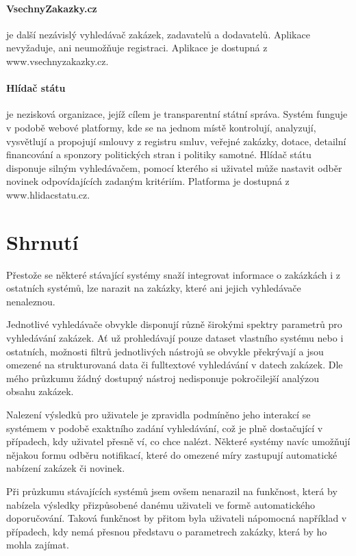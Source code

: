 \documentclass[thesis=M,czech]{FITthesis}[2019/12/23]
\begin{document}
\paragraph{VsechnyZakazky.cz}
je další nezávislý vyhledávač zakázek, zadavatelů a dodavatelů. Aplikace nevyžaduje, ani neumožňuje registraci. Aplikace je dostupná z www.vsechnyzakazky.cz.

\paragraph{Hlídač státu}
 je nezisková organizace, jejíž cílem je transparentní státní správa. Systém funguje v podobě webové platformy, kde se na jednom místě kontrolují, analyzují, vysvětlují a propojují smlouvy z registru smluv, veřejné zakázky, dotace, detailní financování a sponzory politických stran i politiky samotné\cite{hlidacstatu}. Hlídač státu disponuje silným vyhledávačem, pomocí kterého si uživatel může nastavit odběr novinek odpovídajících zadaným kritériím. Platforma je dostupná z www.hlidacstatu.cz.

\newpage
\section{Shrnutí}
\label{sec:current_systems_summary}
Přestože se některé stávající systémy snaží integrovat informace o zakázkách i z ostatních systémů, lze narazit na zakázky, které ani jejich vyhledávače nenaleznou.

Jednotlivé vyhledávače obvykle disponují různě širokými spektry parametrů pro vyhledávání zakázek. Ať už prohledávají pouze dataset vlastního systému nebo i ostatních, možnosti filtrů jednotlivých nástrojů se obvykle překrývají a jsou omezené na strukturovaná data či fulltextové vyhledávání v datech zakázek. Dle mého průzkumu žádný dostupný nástroj nedisponuje pokročilejší analýzou obsahu zakázek.

Nalezení výsledků pro uživatele je zpravidla podmíněno jeho interakcí se systémem v podobě exaktního zadání vyhledávání, což je plně dostačující v případech, kdy uživatel přesně ví, co chce nalézt. Některé systémy navíc umožňují nějakou formu odběru notifikací, které do omezené míry zastupují automatické nabízení zakázek či novinek.

Při průzkumu stávajících systémů jsem ovšem nenarazil na funkčnost, která by nabízela výsledky přizpůsobené danému uživateli ve formě automatického doporučování. Taková funkčnost by přitom byla uživateli nápomocná například v případech, kdy nemá přesnou představu o parametrech zakázky, která by ho mohla zajímat.
\end{document}
